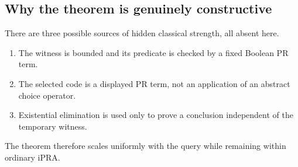 \subsection{Why the theorem is genuinely constructive}

There are three possible sources of hidden classical strength, all absent here.

\begin{enumerate}
\item The witness is bounded and its predicate is checked by a fixed Boolean PR
term.
\item The selected code is a displayed PR term, not an application of an
abstract choice operator.
\item Existential elimination is used only to prove a conclusion independent
of the temporary witness.
\end{enumerate}

The theorem therefore scales uniformly with the query while remaining within
ordinary iPRA.
